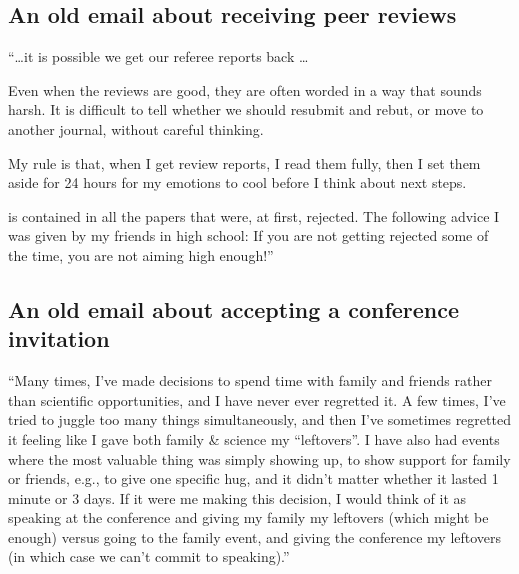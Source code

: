 \documentclass[letterpaper,10pt,english]{sphinxmanual}
\begin{document}
\subsection{An old e\sphinxhyphen{}mail about receiving peer reviews}
\label{\detokenize{OldEmails:an-old-e-mail-about-receiving-peer-reviews}}\label{\detokenize{OldEmails:receiving-reviews}}
\sphinxAtStartPar
“…it is possible we get our referee reports back …

\sphinxAtStartPar
Even when the reviews are good, they are often worded in a way that sounds harsh. It is difficult to tell whether we should resubmit and rebut, or move to another journal, without careful thinking.

\sphinxAtStartPar
My rule is that, when I get review reports, I read them fully, then I set them aside for 24 hours for my emotions to cool before I think about next steps.

\sphinxAtStartPar
{} is contained in all the papers that were, at first, rejected. The following advice I was given by my friends in high school: If you are not getting rejected some of the time, you are not aiming high enough!”


\subsection{An old e\sphinxhyphen{}mail about accepting a conference invitation}
\label{\detokenize{OldEmails:an-old-e-mail-about-accepting-a-conference-invitation}}
\sphinxAtStartPar
“Many times, I’ve made decisions to spend time with family and friends rather than scientific opportunities, and I have never ever regretted it. A few times, I’ve tried to juggle too many things simultaneously, and then I’ve sometimes regretted it \textendash{} feeling like I gave both family \& science my “leftovers”. I have also had events where the most valuable thing was simply showing up, to show support for family or friends, e.g., to give one specific hug, and it didn’t matter whether it lasted 1 minute or 3 days. If it were me making this decision, I would think of it as speaking at the conference and giving my family my leftovers (which might be enough) versus going to the family event, and giving the conference my leftovers (in which case we can’t commit to speaking).”
\end{document}
